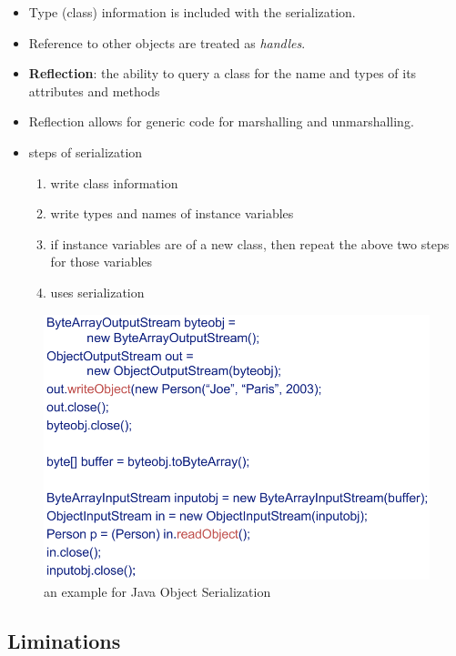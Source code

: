 \documentclass[twocolumn,landscape,10pt]{article}
\theoremstyle{definition}
\begin{document}
\begin{itemize}
    \item Type (class) information is included with the serialization.
    \item Reference to other objects are treated as \emph{handles}.
    \item \textbf{Reflection}: the ability to query a class for the name and
        types of its attributes and methods
    \item Reflection allows for generic code for marshalling and unmarshalling.
    \item steps of serialization
        \begin{enumerate}
            \item write class information
            \item write types and names of instance variables
            \item if instance variables are of a new class, then repeat the
                above two steps for those variables
            \item uses serialization
        \end{enumerate} 
\end{itemize} 

\begin{figure}
  	\includegraphics[scale=0.3]{java_serialization.png}
  	\centering
    \caption{an example for Java Object Serialization}
\end{figure}

\subsection{Liminations}
\end{document}
